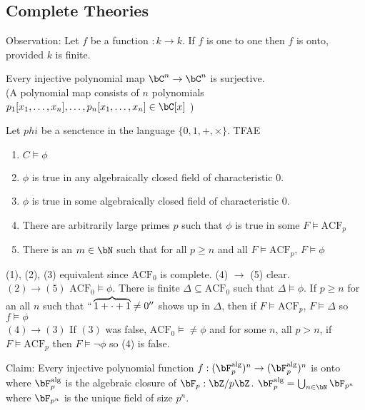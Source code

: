 
\subsection{Complete Theories} 

Observation: Let $f$ be a function $:k \to k$. If $f$ is one to one then $f$ is onto, provided $k$ is finite. \\

\begin{theorem}
    Every injective polynomial map $\bC^n \to \bC^n$ is surjective. \\
    (A polynomial map consists of $n$ polynomials $p_1[x_1, \ldots, x_n], \ldots, p_n[x_1, \ldots, x_n] \in \bC[x]$ )
\end{theorem}

\begin{lemma}
    Let $phi$ be a senctence in the language $\{0, 1, + , \times \}$. TFAE 
    \begin{enumerate}
        \item $C \models \phi$ 
        \item $\phi$ is true in any algebraically closed field of characteristic 0. 
        \item $\phi$ is true in some algebraically closed field of characteristic 0. 
        \item There are arbitrarily large primes $p$ such that $\phi$ is true in some $F \models \text{ACF}_p$ 
        \item There is an $m \in \bN$ such that for all $p \ge n$ and all $F \models \text{ACF}_p$, $F \models \phi$ 
    \end{enumerate}
\end{lemma}

\begin{pf}
    (1), (2), (3) equivalent since $\text{ACF}_0$ is complete. (4) $\to$ (5) clear. \\
    $(2) \to (5)$ $\text{ACF}_0 \models \phi$. There is finite $\Delta \subseteq \text{ACF}_0$ such that $\Delta \models \phi$. If $p \ge n$ for an all $n$ such that $``\overbrace{1 + \cdot + 1} \neq 0''$ shows up in $\Delta$, then if $F \models \text{ACF}_p$, $F \models \Delta$ so $f \models \phi$ \\
    $(4) \to (3)$ If $(3)$ was false, $\text{ACF}_0 \models \neq \phi$ and for some $n$, all $p > n$, if $F \models \text{ACF}_p$ then $F \models \neg \phi$ so (4) is false. 
\end{pf}

\noindent
Claim: Every injective polynomial function $f: (\bF_p^{\text{alg}})^n \to (\bF_p^{\text{alg}})^n$ is onto \\
where $\bF_p^{\text{alg}}$ is the algebraic closure of $\bF_p: \bZ/p\bZ$. $\bF_p^{\text{alg}} = \bigcup_{n \in \bN}\bF_{p^n}$ where $\bF_{p^n}$ is the unique field of size $p^n$. \\

